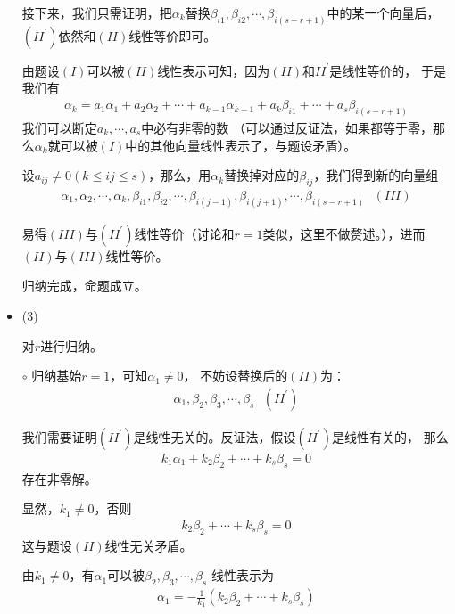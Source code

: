 \documentclass{article}
\begin{document}
\begin{itemize}
        接下来，我们只需证明，把$\alpha_k$替换$\beta_{i1}, \beta_{i2}, \cdots, \beta_{i(s - r + 1)}$中的某一个向量后，
        $(II^\prime)$依然和$(II)$线性等价即可。

        由题设$(I)$可以被$(II)$线性表示可知，因为$(II)$和$II^\prime$是线性等价的，
        于是我们有
        \begin{align*}
          \alpha_k = a_1 \alpha_1 + a_2 \alpha_2 + \cdots + a_{k - 1} \alpha_{k - 1} + a_k \beta_{i1} + \cdots + a_s \beta_{i(s - r + 1)}
        \end{align*}
        我们可以断定$a_k, \cdots, a_s$中必有非零的数
        （可以通过反证法，如果都等于零，那么$\alpha_k$就可以被$(I)$中的其他向量线性表示了，与题设矛盾）。

        设$a_{ij} \neq 0 (k \leq ij \leq s)$，那么，用$\alpha_k$替换掉对应的$\beta_{ij}$，我们得到新的向量组
        \begin{align*}
          \alpha_1, \alpha_2, \cdots, \alpha_{k}, \beta_{i1}, \beta_{i2}, \cdots,
          \beta_{i(j - 1)}, \beta_{i(j + 1)}, \cdots, \beta_{i(s - r + 1)} \ \ \ (III)
        \end{align*}

        易得$(III)$与$(II^\prime)$线性等价（讨论和$r = 1$类似，这里不做赘述。），进而$(II)$与$(III)$线性等价。

        归纳完成，命题成立。

  \item (3)

        对$r$进行归纳。

        $\circ$ 归纳基始$r = 1$，可知$\alpha_1 \neq 0$，
        不妨设替换后的$(II)$为：
        \begin{align*}
          \alpha_1, \beta_2, \beta_3, \cdots, \beta_s \ \ \ (II^\prime)
        \end{align*}

        我们需要证明$(II^\prime)$是线性无关的。反证法，假设$(II^\prime)$是线性有关的，
        那么
        \begin{align*}
          k_1 \alpha_1 + k_2 \beta_2 + \cdots + k_s \beta_s = 0
        \end{align*}
        存在非零解。

        显然，$k_1 \neq 0$，否则
        \begin{align*}
          k_2 \beta_2 + \cdots + k_s \beta_s = 0
        \end{align*}
        这与题设$(II)$线性无关矛盾。

        由$k_1 \neq 0$，有$\alpha_1$可以被$\beta_2, \beta_3, \cdots, \beta_s$
        线性表示为
        \begin{align*}
          \alpha_1 = - \frac{1}{k_1} (k_2 \beta_2 + \cdots + k_s \beta_s)
        \end{align*}


\end{itemize}
\end{document}
